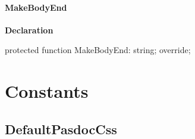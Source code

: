 \documentclass{report}
\newif\ifpdf
\begin{document}
\paragraph*{MakeBodyEnd}\hspace*{\fill}

\label{PasDoc_GenHtml.THTMLDocGenerator-MakeBodyEnd}
\begin{list}{}{
\setlength{\itemindent}{0cm}
\setlength{\listparindent}{0cm}
\setlength{\leftmargin}{\evensidemargin}
\addtolength{\leftmargin}{\tmplength}
\settowidth{\labelsep}{X}
\addtolength{\leftmargin}{\labelsep}
\setlength{\labelwidth}{\tmplength}
}
\item[\textbf{Declaration}\hfill]
\ifpdf
\begin{flushleft}
\fi
\begin{ttfamily}
protected function MakeBodyEnd: string; override;\end{ttfamily}

\ifpdf
\end{flushleft}
\fi

\end{list}
\section{Constants}
\ifpdf
\subsection*{\large{\textbf{DefaultPasdocCss}}\normalsize\hspace{1ex}\hrulefill}
\else
\end{document}
